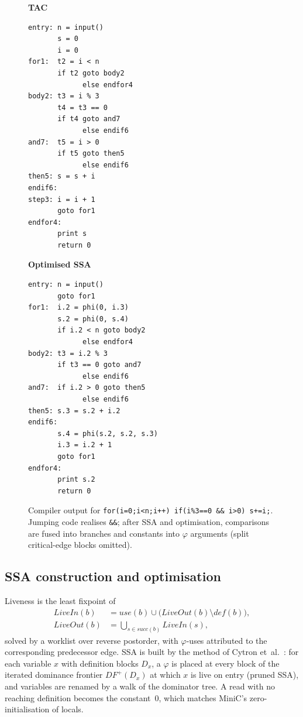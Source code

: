 \documentclass[conference]{IEEEtran}
\newcommand{\tm}[1]{\texttt{#1}}
\begin{document}
\begin{figure}[t]
\centering
\begin{minipage}[t]{0.47\columnwidth}
\scriptsize\textbf{TAC}\vspace{-1mm}
\begin{verbatim}
entry: n = input()
       s = 0
       i = 0
for1:  t2 = i < n
       if t2 goto body2
             else endfor4
body2: t3 = i % 3
       t4 = t3 == 0
       if t4 goto and7
             else endif6
and7:  t5 = i > 0
       if t5 goto then5
             else endif6
then5: s = s + i
endif6:
step3: i = i + 1
       goto for1
endfor4:
       print s
       return 0
\end{verbatim}
\end{minipage}\hfill
\begin{minipage}[t]{0.5\columnwidth}
\scriptsize\textbf{Optimised SSA}\vspace{-1mm}
\begin{verbatim}
entry: n = input()
       goto for1
for1:  i.2 = phi(0, i.3)
       s.2 = phi(0, s.4)
       if i.2 < n goto body2
             else endfor4
body2: t3 = i.2 % 3
       if t3 == 0 goto and7
             else endif6
and7:  if i.2 > 0 goto then5
             else endif6
then5: s.3 = s.2 + i.2
endif6:
       s.4 = phi(s.2, s.2, s.3)
       i.3 = i.2 + 1
       goto for1
endfor4:
       print s.2
       return 0
\end{verbatim}
\end{minipage}
\caption{Compiler output for
\tm{for(i=0;i<n;i++) if(i\%3==0 \&\& i>0) s+=i;}. Jumping code realises
\tm{\&\&}; after SSA and optimisation, comparisons are fused into
branches and constants into $\varphi$ arguments (split critical-edge
blocks omitted).}
\label{fig:tac}
\end{figure}

\subsection{SSA construction and optimisation}

Liveness is the least fixpoint of
\begin{equation}
\begin{aligned}
\mathit{LiveIn}(b)&=\mathit{use}(b)\cup\big(\mathit{LiveOut}(b)\setminus\mathit{def}(b)\big),\\
\mathit{LiveOut}(b)&=\textstyle\bigcup_{s\in\mathit{succ}(b)}\mathit{LiveIn}(s),
\end{aligned}
\label{eq:liveness}
\end{equation}
solved by a worklist over reverse postorder, with $\varphi$-uses
attributed to the corresponding predecessor edge. SSA is built by the
method of Cytron et~al.~\cite{cytron1991ssa}: for each variable $x$ with
definition blocks $D_x$, a $\varphi$ is placed at every block of the
iterated dominance frontier $\mathit{DF}^{+}(D_x)$ at which $x$ is live
on entry (pruned SSA), and variables are renamed by a walk of the
dominator tree. A read with no reaching definition becomes the
constant~0, which matches MiniC's zero-initialisation of locals.
\end{document}
